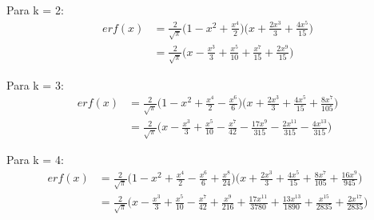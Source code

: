 \documentclass[a4paper]{article}
\begin{document}
Para k = 2:
\begin{align*}
erf(x)
&=\frac{2}{\sqrt{\pi}}\bigg(1-x^{2}+\frac{x^4}{2}\bigg)\bigg(x+\frac{2x^{3}}{3}+\frac{4x^5}{15}\bigg)\\
&=
\frac{2}{\sqrt{\pi}}\bigg(x-\frac{x^{3}}{3}+\frac{x^{5}}{10}+\frac{x^{7}}{15}+\frac{2x^{9}}{15}\bigg)
\end{align*}

Para k = 3:
\begin{align*}
erf(x)
&=\frac{2}{\sqrt{\pi}}\bigg(1-x^{2}+\frac{x^4}{2}-\frac{x^6}{6}\bigg)\bigg(x+\frac{2x^{3}}{3}+\frac{4x^5}{15}+\frac{8x^7}{105}\bigg)\\
&=\frac{2}{\sqrt{\pi}}\bigg(x-\frac{x^3}{3}+\frac{x^5}{10}-\frac{x^7}{42}-\frac{17x^9}{315}-\frac{2x^{11}}{315}-\frac{4x^{13}}{315}\bigg)
\end{align*}

Para k = 4:
\begin{align*}
erf(x)
&=\frac{2}{\sqrt{\pi}}\bigg(1-x^{2}+\frac{x^4}{2}-\frac{x^6}{6}+\frac{x^8}{24}\bigg)\bigg(x+\frac{2x^{3}}{3}+\frac{4x^5}{15}+\frac{8x^7}{105}+\frac{16x^9}{945}\bigg)\\
&=\frac{2}{\sqrt{\pi}}\bigg(x-\frac{x^3}{3}+\frac{x^5}{10}-\frac{x^7}{42}+\frac{x^9}{216}+\frac{17x^{11}}{3780}+\frac{13x^{13}}{1890}+\frac{x^{15}}{2835}+\frac{2x^{17}}{2835}\bigg)
\end{align*}\\

\begin{comment}
Para k = 5:
\begin{align*}
erf(x)
&=\frac{2}{\sqrt{\pi}}\bigg(1-x^{2}+\frac{x^4}{2}-\frac{x^6}{6}+\frac{x^8}{24}-\frac{x^{10}}{120}\bigg)\bigg(x+\frac{2x^{3}}{3}+\frac{4x^5}{15}+\frac{8x^7}{105}+\frac{16x^9}{945}+\frac{32x^{11}}{10395}\bigg)\\
&=\frac{2}{\sqrt{\pi}}\bigg(x-\frac{x^3}{3}+\frac{x^5}{10}-\frac{x^7}{42}+\frac{x^9}{216}-\frac{x^{11}}{1320}-\frac{73x^{13}}{41580}-\frac{103x^{15}}{311850}-\frac{23x^{17}}{51975}-\frac{2x^{19}}{155925}-\frac{4x^{21}}{155925}\bigg)
\end{align*}

Para k = 6:
\begin{align*}
erf(x)
&=\frac{2}{\sqrt{\pi}}\bigg(1-x^{2}+\frac{x^4}{2}-\frac{x^6}{6}+\frac{x^8}{24}-\frac{x^{10}}{120}+\frac{x^{12}}{720}\bigg)\bigg(x+\frac{2x^{3}}{3}+\frac{4x^5}{15}+\frac{8x^7}{105}+\frac{16x^9}{945}+\frac{32x^{11}}{10395}+\frac{64x^{13}}{135135}\bigg)\\
&=\frac{2}{\sqrt{\pi}}\bigg(x-\frac{x^3}{3}+\frac{x^5}{10}-\frac{x^7}{42}+\frac{x^9}{216}-\frac{x^{11}}{1320}+\frac{x^{13}}{9360}+\frac{1979x^{15}}{16216200}+\frac{89x^{17}}{540540}+\frac{19x^{19}}{1351350}+\frac{107x^{21}}{6081075}+\frac{2x^{23}}{6081075}+\frac{4x^{25}}{6081075}bigg)
\end{align*}
\end{comment}
\end{document}
